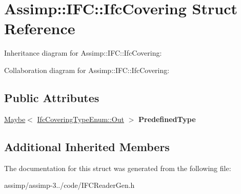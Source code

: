 \hypertarget{struct_assimp_1_1_i_f_c_1_1_ifc_covering}{\section{Assimp\+:\+:I\+F\+C\+:\+:Ifc\+Covering Struct Reference}
\label{struct_assimp_1_1_i_f_c_1_1_ifc_covering}
}


Inheritance diagram for Assimp\+:\+:I\+F\+C\+:\+:Ifc\+Covering\+:


Collaboration diagram for Assimp\+:\+:I\+F\+C\+:\+:Ifc\+Covering\+:
\subsection*{Public Attributes}
\begin{DoxyCompactItemize}
\item 
\hypertarget{struct_assimp_1_1_i_f_c_1_1_ifc_covering_a3b8a166b6f729ee0e717c35deb1e72d8}{\hyperlink{struct_assimp_1_1_s_t_e_p_1_1_maybe}{Maybe}$<$ \hyperlink{classboost_1_1shared__ptr}{Ifc\+Covering\+Type\+Enum\+::\+Out} $>$ {\bfseries Predefined\+Type}}\label{struct_assimp_1_1_i_f_c_1_1_ifc_covering_a3b8a166b6f729ee0e717c35deb1e72d8}

\end{DoxyCompactItemize}
\subsection*{Additional Inherited Members}


The documentation for this struct was generated from the following file\+:\begin{DoxyCompactItemize}
\item 
assimp/assimp-\/3../code/I\+F\+C\+Reader\+Gen.\+h\end{DoxyCompactItemize}
